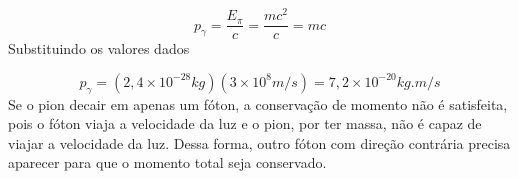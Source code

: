 \documentclass[10pt,a4paper]{article}
\begin{document}
\begin{equation}
p_{\gamma} = \frac{E_{\pi}}{c} = \frac{mc^2}{c} = mc
\end{equation}
Substituindo os valores dados 

\begin{equation}
p_{\gamma} = (2,4\times 10^{-28}\si{kg})(3\times 10^8 \unit{m/s}) = 7,2 \times 10^{-20}\si{kg.m/s}
\end{equation}
Se o pion decair em apenas um fóton, a conservação de momento não é satisfeita, pois o fóton viaja a velocidade da luz e o pion, por ter massa, não é capaz de viajar a velocidade da luz. Dessa forma, outro fóton com direção contrária precisa aparecer para que o momento total seja conservado.
\end{document}
